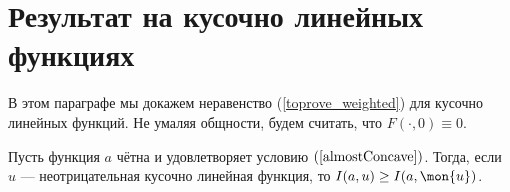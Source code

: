 \section{Результат на кусочно линейных функциях}


В этом параграфе мы докажем неравенство (\ref{toprove_weighted}) для кусочно линейных функций.
Не умаляя общности, будем считать, что $F(\cdot, 0) \equiv 0$.

\begin{theorem}
\label{linth}
Пусть функция $a$ чётна и удовлетворяет условию $(\ref{almostConcave})$.
Тогда, если $u$ --- неотрицательная кусочно линейная функция, то $I(a, u) \ge I(a, \mon{u})$.
\end{theorem}

